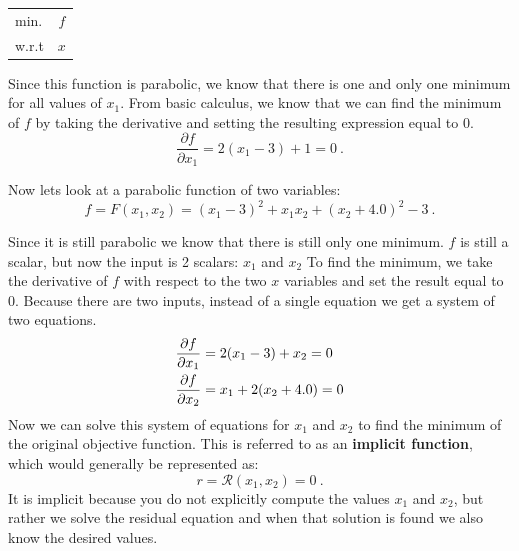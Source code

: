 \documentclass[conf]{new-aiaa}
\begin{document}
    \begin{table}[H]
        \centering
        \begin{tabular}{lc}
            \hline
            min. & $f$ \\
            w.r.t & $x$ \\ \hline
        \end{tabular}
    \end{table}


    Since this function is parabolic, we know that there is one and only one minimum for all values of $x_1$. 
    From basic calculus, we know that we can find the minimum of $f$ by taking the derivative and setting the resulting expression equal to 0. 
    \begin{equation}
        \frac{\partial f}{\partial x_1} = 2(x_1 - 3) + 1 = 0 \ . 
    \end{equation}

    Now lets look at a parabolic function of two variables: 
    \begin{equation}
        f = F(x_1,x_2) = (x_1 - 3)^2 + x_1 x_2 + (x_2 + 4.0)^2 - 3 \ . 
    \end{equation}

    Since it is still parabolic we know that there is still only one minimum. 
    $f$ is still a scalar, but now the input is 2 scalars: $x_1$ and $x_2$
    To find the minimum, we take the derivative of $f$ with respect to the two $x$ variables and set the result equal to 0. 
    Because there are two inputs, instead of a single equation we get a system of two equations. 
    \begin{align}
        \frac{\partial f}{\partial x_1} &= 2(x_1 - 3) + x_2 = 0 \notag \\
        \frac{\partial f}{\partial x_2} &= x_1 + 2(x_2 + 4.0) = 0 \label{eq:linear_deriv}
    \end{align}
    Now we can solve this system of equations for $x_1$ and $x_2$ to find the minimum of the original objective function. 
    This is referred to as an \textbf{implicit function}, which would generally be represented as: 
    \begin{equation} 
    r = \mathcal{R}(x_1, x_2) = 0 \ . 
    \end{equation}
    It is implicit because you do not explicitly compute the values $x_1$ and $x_2$, but rather we solve the residual equation and when that solution is found we also know the desired values. 
\end{document}
